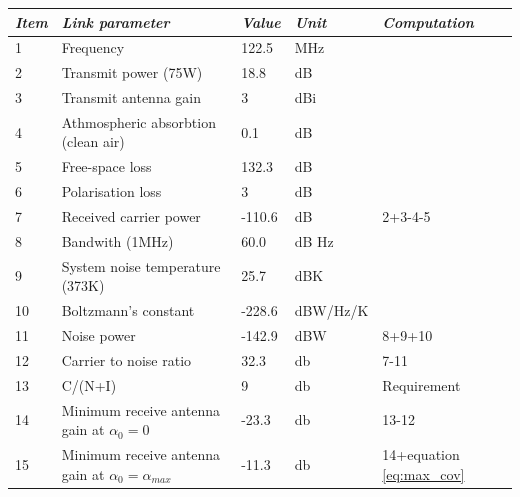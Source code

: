 \begin{center}
 \label{tab:122.5}
  \begin{tabular}{ l  l  l  l  l}
    \hline
   \textit{Item} & \textit{Link parameter} & \textit{Value} & \textit{Unit} & \textit{Computation} \\ \hline
    1 & Frequency	& 122.5 & MHz & \\ \hline
    2 & Transmit power (75W) & 18.8 & dB & \\ \hline
    3 & Transmit antenna gain & 3 & dBi & \\ \hline
    4 & Athmospheric absorbtion (clean air) & 0.1 & dB & \\ \hline
    5 & Free-space loss & 132.3 & dB & \\ \hline
    6 & Polarisation loss & 3 & dB & \\ \hline
    7 & Received carrier power & -110.6 & dB & 2+3-4-5\\ \hline
    8 & Bandwith (1MHz) & 60.0 & dB Hz & \\ \hline 
    9 & System noise temperature (373K) & 25.7 & dBK& \\ \hline 
    10 & Boltzmann's constant & -228.6 & dBW/Hz/K& \\ \hline 
    11 & Noise power & -142.9 & dBW& 8+9+10\\ \hline 
    12 & Carrier to noise ratio & 32.3 & db & 7-11\\ \hline 
    13 & C/(N+I) & 9 & db & Requirement\\ \hline
    14 & Minimum receive antenna gain at $\alpha_0 = 0 $ & -23.3 & db & 13-12\\ \hline
    15 & Minimum receive antenna gain at $\alpha_0 = \alpha_{max} $ & -11.3 & db & 14+equation \ref{eq:max_cov} \\ \hline
  \end{tabular}
\end{center}

\fi